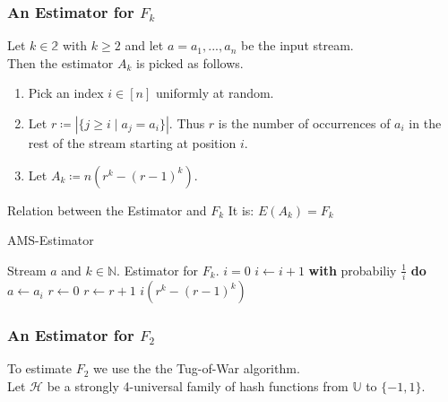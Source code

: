 \documentclass[english]{panikzettel}
\begin{document}
\subsubsection{An Estimator for $F_k$}
\begin{halfboxl}
\vspace{-\baselineskip}
	Let $k\in\mathbb{2}$ with $k\geq 2$ and let $a=a_1,...,a_n$ be the input stream.\\
	Then the estimator $A_k$ is picked as follows.
	\begin{enumerate}
	\item Pick an index $i\in [n]$ uniformly at random.
	\item Let $r\coloneqq |\{j\geq i \mid a_j=a_i \}|$. Thus $r$ is the number of occurrences of $a_i$ in the rest of the stream starting at position $i$.
	\item Let $A_k\coloneqq n(r^k-(r-1)^k)$.
	\end{enumerate}
	\begin{theo}{Relation between the Estimator and $F_k$}
	It is:
	$E(A_k)=F_k$
	\end{theo}
\end{halfboxl}
\begin{halfboxr}
\vspace{-\baselineskip}
	\begin{algo}{AMS-Estimator}
	{
	\renewcommand{\algorithmicrequire}{\textbf{Input:}}
	\renewcommand{\algorithmicensure}{\textbf{Output:}}
	  \begin{algorithmic}[1]
	  \Require Stream $a$ and $k\in\mathbb{N}$.
 	    \Ensure Estimator for $F_k$.
	  \State $i=0$
	    \State $i\leftarrow i+1$
	    \State \textbf{with} probabiliy $\frac{1}{i}$ \textbf{do}
	    \State\hspace{\algorithmicindent} $a\leftarrow a_i$
	    \State\hspace{\algorithmicindent} $r\leftarrow 0$
	      \State $r\leftarrow r+1$
	    \EndIf
	  \EndWhile
	  \State \Return $i(r^k-(r-1)^k)$
	  \end{algorithmic}
	}
	\end{algo}
\end{halfboxr}

\subsubsection{An Estimator for $F_2$}
To estimate $F_2$ we use the the Tug-of-War algorithm.\\
Let $\mathcal{H}$ be a strongly 4-universal family of hash functions from $\mathbb{U}$ to $\{-1,1\}$.
\end{document}
